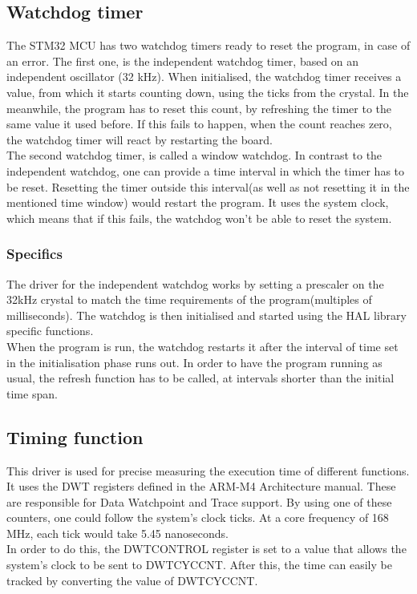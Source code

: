 \subsection{Watchdog timer}
The STM32 MCU has two watchdog timers ready to reset the program, in case of an error.
The first one, is the independent watchdog timer, based on an independent oscillator (32 kHz).
When initialised, the watchdog timer receives a value, from which it starts counting down, using
the ticks from the crystal. In the meanwhile, the program has to reset this count, by refreshing 
the timer to the same value it used before. If this fails to happen, when the count reaches zero, 
the watchdog timer will react by restarting the board.
\\
The second watchdog timer, is called a window watchdog. In contrast to the independent watchdog, 
one can provide a time interval in which the timer has to be reset. Resetting the timer outside this interval(as well as not resetting it in the mentioned time window) would restart the program. It uses 
the system clock, which means that if this fails, the watchdog won't be able to reset the system.

\subsubsection{Specifics}
The driver for the independent watchdog works by setting a prescaler on the 32kHz crystal to match 
the time requirements of the program(multiples of milliseconds). The watchdog is then initialised 
and started using the HAL library specific functions. \\
When the program is run, the watchdog restarts it after the interval of time set in the initialisation
phase runs out. In order to have the program running as usual, the refresh function has to be called,
 at intervals shorter than the initial time span.

\subsection{Timing function}
This driver is used for precise measuring the execution time of different functions. It uses the DWT
 registers defined in the ARM-M4 Architecture manual. These are responsible for Data Watchpoint 
 and Trace support. By using one of these counters, one could follow the system's clock ticks. 
 At a core frequency of 168 MHz, each tick would take 5.45 nanoseconds.\\
In order to do this, the DWT\textunderscore CONTROL register is set to a value that allows the system's clock to be sent to DWT\textunderscore CYCCNT. After this, the time can easily be tracked by converting the value of DWT\textunderscore CYCCNT.